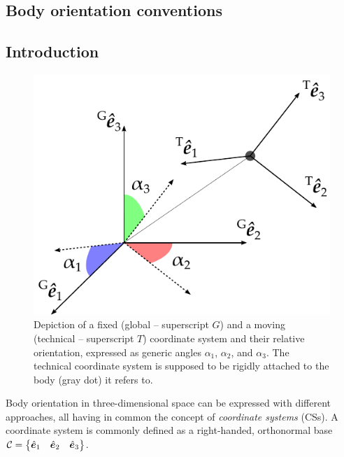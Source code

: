 \begin{appendices}
\appendixpage
\noappendicestocpagenum
\addappheadtotoc


\chapter{Body orientation conventions}\setlength{\parindent}{0pt}
\section{Introduction}

\begin{figure}[ht]
    \centering
    \includegraphics{img/XX_appendices/xx_01.pdf}
    \caption{Depiction of a fixed (global -- superscript $G$) and a moving (technical -- superscript $T$) coordinate system and their relative orientation, expressed as generic angles $\alpha_1$, $\alpha_2$, and $\alpha_3$. The technical coordinate system is supposed to be rigidly attached to the body (gray dot) it refers to.}
    \label{fig:coordinate_systems_general}
\end{figure}

Body orientation in three-dimensional space can be expressed with different approaches, all having in common the concept of \textit{coordinate systems} (CSs). A coordinate system is commonly defined as a right-handed, orthonormal base $\mathcal{C} = \begin{Bmatrix} \hat{\bm{e}}_1 & \hat{\bm{e}}_2 & \hat{\bm{e}}_3 \end{Bmatrix}$. 


\end{appendices}
